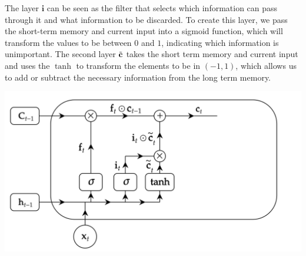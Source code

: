 \documentclass{article}
\begin{document}
\begin{enumerate}
        The layer $\mathbf{i}$ can be seen as the filter that selects which information can pass through it and what information to be discarded. To create this layer, we pass the short-term memory and current input into a sigmoid function, which will transform the values to be between $0$ and $1$, indicating which information is unimportant. The second layer $\Tilde{\mathbf{c}}$ takes the short term memory and current input and uses the $\tanh$ to transform the elements to be in $(-1, 1)$, which allows us to add or subtract the necessary information from the long term memory. 
        \begin{center}
            \includegraphics[scale=0.25]{img/04_RNN/LSTM_node_2.png}
        \end{center}


\end{enumerate}
\end{document}

